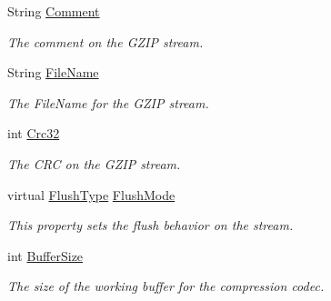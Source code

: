 \begin{DoxyCompactItemize}
\item 
String \mbox{\hyperlink{class_super_tiled2_unity_1_1_ionic_1_1_zlib_1_1_g_zip_stream_a52ef5182490dec747b8d57a32f673668}{Comment}}
\begin{DoxyCompactList}\small\item\em The comment on the G\+Z\+IP stream. \end{DoxyCompactList}\item 
String \mbox{\hyperlink{class_super_tiled2_unity_1_1_ionic_1_1_zlib_1_1_g_zip_stream_a9f84ab701414ec04ac9ef7107eb4a30c}{File\+Name}}
\begin{DoxyCompactList}\small\item\em The File\+Name for the G\+Z\+IP stream. \end{DoxyCompactList}\item 
int \mbox{\hyperlink{class_super_tiled2_unity_1_1_ionic_1_1_zlib_1_1_g_zip_stream_a70e29334f61c43bc2c37591177f1869a}{Crc32}}
\begin{DoxyCompactList}\small\item\em The C\+RC on the G\+Z\+IP stream. \end{DoxyCompactList}\item 
virtual \mbox{\hyperlink{namespace_super_tiled2_unity_1_1_ionic_1_1_zlib_a2c5853fd63f03c83ac2458da1f4ff3bc}{Flush\+Type}} \mbox{\hyperlink{class_super_tiled2_unity_1_1_ionic_1_1_zlib_1_1_g_zip_stream_aa04b0e1934fafb1582f6d4bc8ce54542}{Flush\+Mode}}
\begin{DoxyCompactList}\small\item\em This property sets the flush behavior on the stream. \end{DoxyCompactList}\item 
int \mbox{\hyperlink{class_super_tiled2_unity_1_1_ionic_1_1_zlib_1_1_g_zip_stream_a62b26d1385352043955773fe1366c029}{Buffer\+Size}}
\begin{DoxyCompactList}\small\item\em The size of the working buffer for the compression codec. \end{DoxyCompactList}\item 

\end{DoxyCompactItemize}
